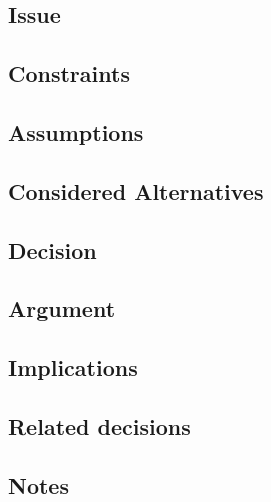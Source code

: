 \subsection*{Issue}

\subsection*{Constraints}

\subsection*{Assumptions}

\subsection*{Considered Alternatives}

\subsection*{Decision}

\subsection*{Argument}

\subsection*{Implications}

\subsection*{Related decisions}

\subsection*{Notes}